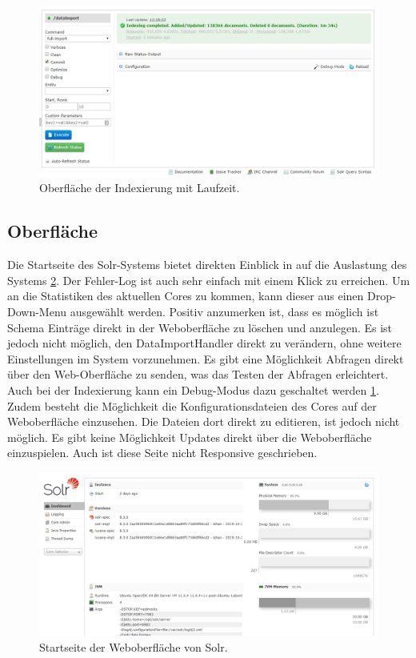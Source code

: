 \begin{figure}
	\centering
	\includegraphics[width=1\linewidth]{images/solr_indexing_time.png}
	\caption{Oberfläche der Indexierung mit Laufzeit.}
	\label{img:solrIndexTime}
\end{figure}

\subsection{Oberfläche}

Die Startseite des Solr-Systems bietet direkten Einblick in auf die Auslastung des Systems \ref{img:solrInterface}. Der Fehler-Log ist auch sehr einfach mit einem Klick zu erreichen. Um an die Statistiken des aktuellen Cores zu kommen, kann dieser aus einen Drop-Down-Menu ausgewählt werden. Positiv anzumerken ist, dass es möglich ist Schema Einträge direkt in der Weboberfläche zu löschen und anzulegen. Es ist jedoch nicht möglich, den DataImportHandler direkt zu verändern, ohne weitere Einstellungen im System vorzunehmen. Es gibt eine Möglichkeit Abfragen direkt über den Web-Oberfläche zu senden, was das Testen der Abfragen erleichtert. Auch bei der Indexierung kann ein Debug-Modus dazu geschaltet werden \ref{img:solrIndexTime}. Zudem besteht die Möglichkeit die Konfigurationsdateien des Cores auf der Weboberfläche einzusehen. Die Dateien dort direkt zu editieren, ist jedoch nicht möglich.
Es gibt keine Möglichkeit Updates direkt über die Weboberfläche einzuspielen. Auch ist diese Seite nicht Responsive geschrieben. 
\begin{figure}
	\centering
	\includegraphics[width=1\linewidth]{images/solr_interface.png}
	\caption{Startseite der Weboberfläche von Solr.}
	\label{img:solrInterface}
\end{figure}


